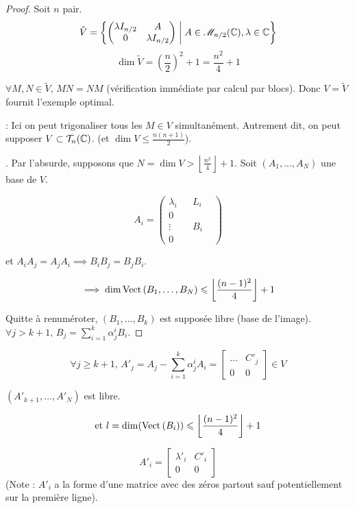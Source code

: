 \begin{proof}
    Soit $n$ pair.
    \[ \tilde V = \left\{ \begin{pmatrix} \lambda I_{n/2} & A \\ 0 & \lambda I_{n/2} \end{pmatrix} \;\middle|\; A \in \mathscr M_{n/2}(\mathbb{C}), \lambda \in \mathbb{C} \right\} \]
    \[ \dim \tilde V = \left(\frac{n}{2}\right)^2 + 1 = \frac{n^2}{4} + 1 \]
    
    $\forall M, N \in \tilde V, \, MN = NM$ (vérification immédiate par calcul par blocs).
    Donc $V = \tilde V$ fournit l'exemple optimal.
    
    \lvspace
     : Ici on peut trigonaliser tous les $M \in V$ simultanément.
    Autrement dit, on peut supposer $V \subset \mathcal T_n(\mathbb{C})$.
    (et $\dim V \leqslant \frac{n(n+1)}{2}$).
    
    .
    Par l'absurde, supposons que $N = \dim V > \left\lfloor \frac{n^2}{4} \right\rfloor + 1$.
    Soit $(A_1, \dots, A_N)$ une base de $V$.
    
    \[ A_i = \left( \begin{array}{c|ccc} \lambda_i & & L_i & \\ \hline 0 & & & \\ \vdots & & B_i & \\ 0 & & & \end{array} \right) \]
    
    et $A_i A_j = A_j A_i \implies B_i B_j = B_j B_i$.
    
    \[ \implies \dim \operatorname{Vect} \,(B_1, \dots, B_N) \leqslant \left\lfloor \frac{(n-1)^2}{4} \right\rfloor + 1 \]
    
    Quitte à renuméroter, $(B_1, \dots, B_k)$ est supposée libre (base de l'image).
    $\forall j > k+1, \, B_j = \sum_{i=1}^k \alpha_j^i B_i$.
\end{proof}

\[ \forall j \geqslant k+1, \, A'_j = A_j - \sum_{i=1}^k \alpha_j^i A_i = \left[ \begin{array}{c|c} \dots & C'_j \\ \hline 0 & 0 \end{array} \right] \in V \]

$(A'_{k+1}, \dots, A'_N)$ est libre.

\[ \text{et } l = \dim(\operatorname{Vect} \,(B_i)) \leqslant \left\lfloor \frac{(n-1)^2}{4} \right\rfloor + 1 \]

\[ A'_i = \left[ \begin{array}{c|c} \lambda'_i & C'_i \\ \hline 0 & 0 \end{array} \right] \]
(Note : $A'_i$ a la forme d'une matrice avec des zéros partout sauf potentiellement sur la première ligne).

